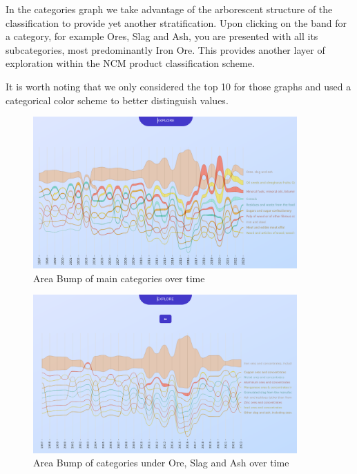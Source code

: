 \documentclass[12pt,a4]{article}
\begin{document}
In the categories graph we take advantage of the arborescent structure of the classification to provide yet another stratification. Upon clicking on the band for a category, for example Ores, Slag and Ash, you are presented with all its subcategories, most predominantly Iron Ore. This provides another layer of exploration within the NCM product classification scheme.

It is worth noting that we only considered the top 10 for those graphs and used a categorical color scheme to better distinguish values.

\begin{figure}[H]
    \centering
    \includegraphics[width=0.9\textwidth]{assets/bump1.png}
    \caption{Area Bump of main categories over time}
\end{figure}

\begin{figure}[H]
    \centering
    \includegraphics[width=0.9\textwidth]{assets/bump2.png}
    \caption{Area Bump of categories under Ore, Slag and Ash over time}
\end{figure}
\end{document}
